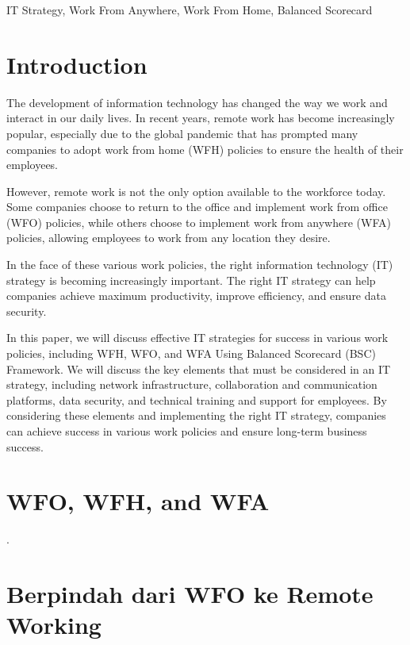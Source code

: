 \documentclass[conference]{IEEEtran}
\begin{document}
\begin{IEEEkeywords}
IT Strategy, Work From Anywhere, Work From Home, Balanced Scorecard
\end{IEEEkeywords}

\section{Introduction}
The development of information technology has changed the way we work and interact in our daily lives. In recent years, remote work has become increasingly popular, especially due to the global pandemic that has prompted many companies to adopt work from home (WFH) policies to ensure the health of their employees.

However, remote work is not the only option available to the workforce today. Some companies choose to return to the office and implement work from office (WFO) policies, while others choose to implement work from anywhere (WFA) policies, allowing employees to work from any location they desire.

In the face of these various work policies, the right information technology (IT) strategy is becoming increasingly important. The right IT strategy can help companies achieve maximum productivity, improve efficiency, and ensure data security.

In this paper, we will discuss effective IT strategies for success in various work policies, including WFH, WFO, and WFA Using Balanced Scorecard (BSC) Framework. We will discuss the key elements that must be considered in an IT strategy, including network infrastructure, collaboration and communication platforms, data security, and technical training and support for employees. By considering these elements and implementing the right IT strategy, companies can achieve success in various work policies and ensure long-term business success.

\section{WFO, WFH, and WFA}
.


\section{Berpindah dari WFO ke Remote Working}
\end{document}
